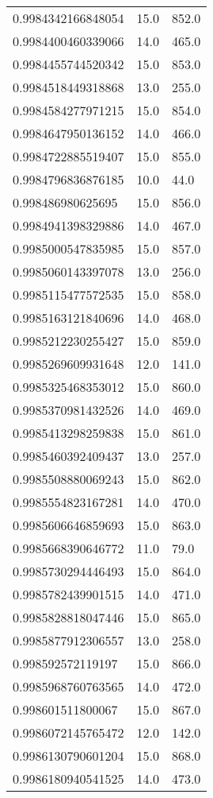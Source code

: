 \begin{center}
\begin{supertabular}[H]{p{0.30\textwidth}p{0.05\textwidth}p{0.05\textwidth}}
0.9984342166848054 & 15.0 & 852.0 \\ 
0.9984400460339066 & 14.0 & 465.0 \\ 
0.9984455744520342 & 15.0 & 853.0 \\ 
0.9984518449318868 & 13.0 & 255.0 \\ 
0.9984584277971215 & 15.0 & 854.0 \\ 
0.9984647950136152 & 14.0 & 466.0 \\ 
0.9984722885519407 & 15.0 & 855.0 \\ 
0.9984796836876185 & 10.0 & 44.0 \\ 
0.998486980625695 & 15.0 & 856.0 \\ 
0.9984941398329886 & 14.0 & 467.0 \\ 
0.9985000547835985 & 15.0 & 857.0 \\ 
0.9985060143397078 & 13.0 & 256.0 \\ 
0.9985115477572535 & 15.0 & 858.0 \\ 
0.9985163121840696 & 14.0 & 468.0 \\ 
0.9985212230255427 & 15.0 & 859.0 \\ 
0.9985269609931648 & 12.0 & 141.0 \\ 
0.9985325468353012 & 15.0 & 860.0 \\ 
0.9985370981432526 & 14.0 & 469.0 \\ 
0.9985413298259838 & 15.0 & 861.0 \\ 
0.9985460392409437 & 13.0 & 257.0 \\ 
0.9985508880069243 & 15.0 & 862.0 \\ 
0.9985554823167281 & 14.0 & 470.0 \\ 
0.9985606646859693 & 15.0 & 863.0 \\ 
0.9985668390646772 & 11.0 & 79.0 \\ 
0.9985730294446493 & 15.0 & 864.0 \\ 
0.9985782439901515 & 14.0 & 471.0 \\ 
0.9985828818047446 & 15.0 & 865.0 \\ 
0.9985877912306557 & 13.0 & 258.0 \\ 
0.998592572119197 & 15.0 & 866.0 \\ 
0.9985968760763565 & 14.0 & 472.0 \\ 
0.998601511800067 & 15.0 & 867.0 \\ 
0.9986072145765472 & 12.0 & 142.0 \\ 
0.9986130790601204 & 15.0 & 868.0 \\ 
0.9986180940541525 & 14.0 & 473.0 \\ 

\end{supertabular}
\end{center}
